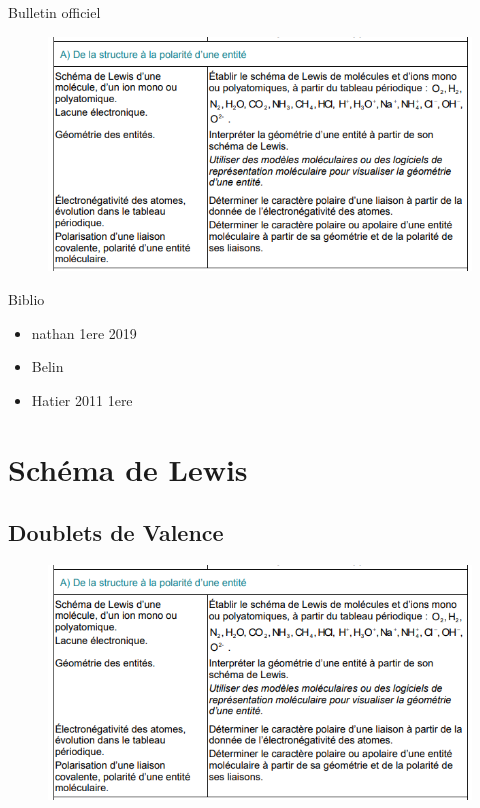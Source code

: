 \documentclass{beamer}
\begin{document}
\maketitle

\begin{frame}{Bulletin officiel}
    \begin{figure}
        \centering
        \includegraphics[width=.7\textwidth]{Bo.png}
    \end{figure}
\end{frame}

\begin{frame}
    \tableofcontents
\end{frame}

\begin{frame}{Biblio}
    \begin{itemize}
        \item nathan 1ere 2019
        \item Belin 
        \item Hatier 2011 1ere 
    \end{itemize}
\end{frame}
\section{Schéma de Lewis}
\subsection{Doublets de Valence}

\begin{frame}
    \begin{figure}
        \centering
        \includegraphics[width=.5\textwidth]{BO.png}
    \end{figure}
\end{frame}
\end{document}
